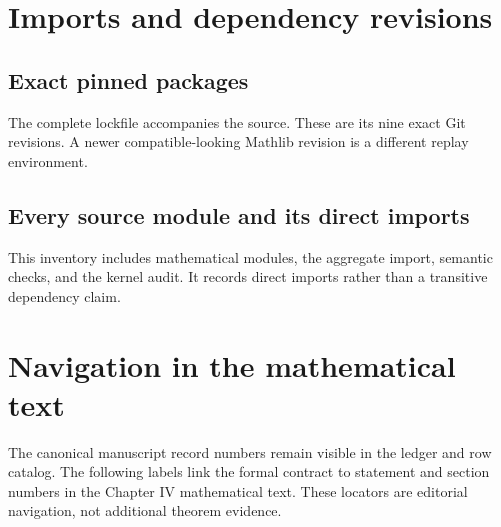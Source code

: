 \section{Imports and dependency revisions}
\subsection{Exact pinned packages}
The complete lockfile accompanies the source. These are its nine exact Git revisions. A newer compatible-looking Mathlib revision is a different replay environment.

\subsection{Every source module and its direct imports}
This inventory includes mathematical modules, the aggregate import, semantic checks, and the kernel audit. It records direct imports rather than a transitive dependency claim.

\clearpage
\section{Navigation in the mathematical text}
The canonical manuscript record numbers remain visible in the ledger and row catalog. The following labels link the formal contract to statement and section numbers in the Chapter IV mathematical text. These locators are editorial navigation, not additional theorem evidence.


